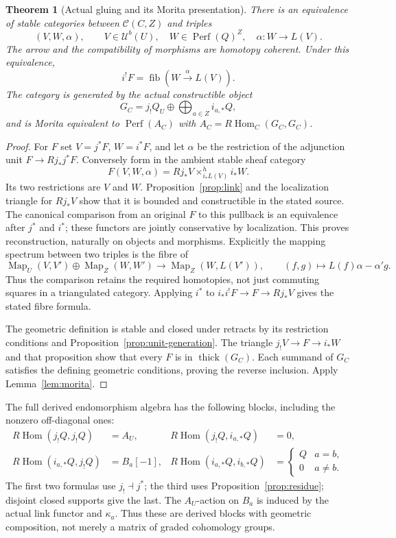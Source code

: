 \documentclass[11pt]{article}
\newtheorem{theorem}{Theorem}[section]
\theoremstyle{definition}
\theoremstyle{remark}
\newcommand{\Perf}{\operatorname{Perf}}
\newcommand{\RHom}{R\operatorname{Hom}}
\newcommand{\thick}{\operatorname{thick}}
\begin{document}
\begin{theorem}[Actual gluing and its Morita presentation]
\label{thm:gluing}
There is an equivalence of stable categories between $\mathcal C(C,Z)$
and triples
\[
 (V,W,\alpha),\qquad V\in\mathcal U^b(U),\quad W\in\Perf(Q)^Z,
 \quad\alpha:W\longrightarrow L(V).
\]
The arrow and the compatibility of morphisms are homotopy coherent.
Under this equivalence,
\[
 i^!F=\operatorname{fib}(W\xrightarrow{\alpha}L(V)).
\]
The category is generated by the actual constructible object
\[
 G_C=j_!Q_U\oplus\bigoplus_{a\in Z}i_{a,*}Q,
\]
and is Morita equivalent to $\Perf(A_C)$ with
$A_C=\RHom_C(G_C,G_C)$.
\end{theorem}
\begin{proof}
For $F$ set $V=j^*F$, $W=i^*F$, and let $\alpha$ be the restriction
of the adjunction unit $F\to Rj_*j^*F$.  Conversely form in the ambient
stable sheaf category
\[
 F(V,W,\alpha)=Rj_*V\mathop{\times}^{h}_{i_*L(V)}i_*W.
\]
Its two restrictions are $V$ and $W$.  Proposition~\ref{prop:link}
and the localization triangle for $Rj_*V$ show that it is bounded and
constructible in the stated source.  The canonical comparison from an
original $F$ to this pullback is an equivalence after $j^*$ and $i^*$;
these functors are jointly conservative by localization.  This proves
reconstruction, naturally on objects and morphisms.  Explicitly the
mapping spectrum between two triples is the fibre of
\[
 \operatorname{Map}_U(V,V')\oplus\operatorname{Map}_Z(W,W')
 \longrightarrow\operatorname{Map}_Z(W,L(V')),
 \qquad (f,g)\longmapsto L(f)\alpha-\alpha'g.
\]
Thus the comparison retains the required homotopies, not just commuting
squares in a triangulated category.  Applying $i^*$ to
$i_*i^!F\to F\to Rj_*V$ gives the stated fibre formula.

The geometric definition is stable and closed under retracts by its
restriction conditions and Proposition~\ref{prop:unit-generation}.
The triangle $j_!V\to F\to i_*W$ and that proposition show that every
$F$ is in $\thick(G_C)$.  Each summand of $G_C$ satisfies the defining
geometric conditions, proving the reverse inclusion.  Apply
Lemma~\ref{lem:morita}.
\end{proof}

The full derived endomorphism algebra has the following blocks, including
the nonzero off-diagonal ones:
\[
\begin{aligned}
 \RHom(j_!Q,j_!Q)&=A_U, &
 \RHom(j_!Q,i_{a,*}Q)&=0,\\
 \RHom(i_{a,*}Q,j_!Q)&=B_a[-1], &
 \RHom(i_{a,*}Q,i_{b,*}Q)&=
 \begin{cases}Q&a=b,\\0&a\ne b.\end{cases}
\end{aligned}
\]
The first two formulas use $j_!\dashv j^*$; the third uses
Proposition~\ref{prop:residue}; disjoint closed supports give the last.
The $A_U$-action on $B_a$ is induced by the actual link functor and
$\kappa_a$.  Thus these are derived blocks with geometric composition,
not merely a matrix of graded cohomology groups.
\end{document}
